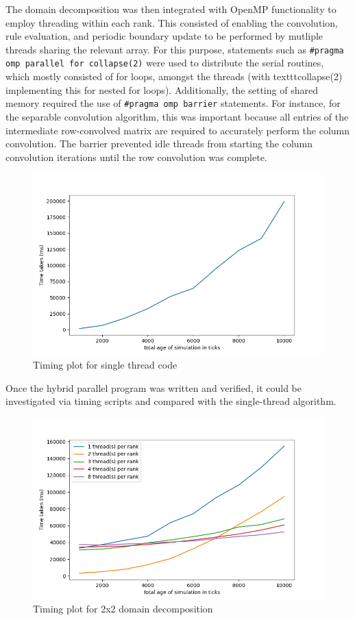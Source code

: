 \documentclass[12pt]{article}
\begin{document}
The domain decomposition was then integrated with OpenMP functionality to employ threading within each rank.
This consisted of enabling the convolution, rule evaluation, and periodic boundary update to be performed by mutliple threads sharing the relevant array.
For this purpose, statements such as \texttt{\#pragma omp parallel for collapse(2)} were used to distribute the serial routines,
which mostly consisted of for loops, amongst the threads (with texttt{collapse(2)} implementing this for nested for loops).
Additionally, the setting of shared memory required the use of \texttt{\#pragma omp barrier} statements.
For instance, for the separable convolution algorithm, this was important because all entries of the intermediate row-convolved matrix are required to accurately perform the column convolution.
The barrier prevented idle threads from starting the column convolution iterations until the row convolution was complete.

\begin{figure}[hp]
    \includegraphics[scale=0.65, center]{figures/time_simulation.png}
    \caption{Timing plot for single thread code}
    \label{fig:time_r4}
\end{figure}

Once the hybrid parallel program was written and verified, it could be investigated via timing scripts and compared with the single-thread algorithm.



\begin{figure}[hp]
    \includegraphics[scale=0.65, center]{figures/time_hybrid_r4_plot.png}
    \caption{Timing plot for 2x2 domain decomposition}
    \label{fig:time_r4}
\end{figure}
\end{document}
